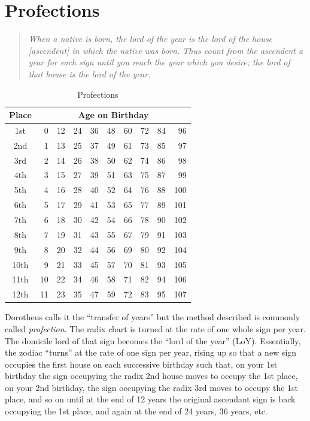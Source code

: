 \section{Profections}
\begin{quote}
\textsl{When a native is born, the lord of the year is the lord of the house [ascendent] in which the native was born. Thus count from the ascendent a year for each sign until you reach the year which you desire; the lord of that house is the lord of the year.}
\end{quote}

\begin{table}[h]
\small
\center
\begin{tabular}[c]{|c|r r r r r r r r r|}
\hline
Place & \multicolumn{9}{|c|}{Age on Birthday}\\
\hline
1st  & 0 & 12 & 24 & 36 & 48 & 60 & 72 & 84 & 96 \\
2nd & 1 & 13 & 25 & 37 & 49 & 61 & 73 & 85 & 97 \\
3rd  & 2 & 14 & 26 & 38 & 50 & 62 & 74 & 86 & 98 \\
\hline
4th  & 3 & 15 & 27 & 39 & 51 & 63 & 75 & 87 &  99 \\
5th  & 4 & 16 & 28 & 40 & 52 & 64 & 76 & 88 & 100 \\
6th  & 5 & 17 & 29 & 41 & 53 & 65 & 77 & 89 & 101 \\
\hline
7th  & 6 & 18 & 30 & 42 & 54 & 66 & 78 & 90 & 102 \\
8th  & 7 & 19 & 31 & 43 & 55 & 67 & 79 & 91 & 103 \\
9th  & 8 & 20 & 32 & 44 & 56 & 69 & 80 & 92 & 104 \\
\hline
10th  &   9 & 21 & 33 & 45 & 57 & 70 & 81 & 93 & 105 \\
11th  & 10 & 22 & 34 & 46 & 58 & 71 & 82 & 94 & 106 \\
12th  & 11 & 23 & 35 & 47 & 59 & 72 & 83 & 95 & 107 \\
\hline
\end{tabular}
\caption{Profections}
\end{table}

Dorotheus calls it the ``transfer of years'' but the method described is commonly called \textsl{profection}. The radix chart is turned at the rate of one whole sign per year. The domicile lord of that sign becomes the ``lord of the year'' (LoY). Essentially, the zodiac ``turns'' at the rate of one sign per year, rising up so that a new sign occupies the first house on each successive birthday such that, on your 1st birthday the sign occupying the radix 2nd house moves to occupy the 1st place, on your 2nd birthday, the sign occupying the radix 3rd moves to occupy the 1st place, and so on until at the end of 12 years the original ascendant sign is back occupying the 1st place, and again at the end of 24 years, 36 years, etc.

